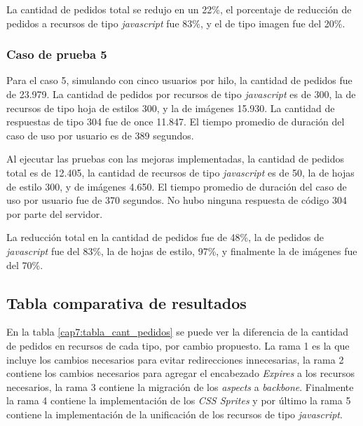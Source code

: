 La cantidad de pedidos total se redujo en un 22\%, el porcentaje de reducción de pedidos a recursos de tipo \emph{javascript} fue 83\%, y el de 
tipo imagen fue del 20\%.

\subsubsection{Caso de prueba 5}

Para el caso 5, simulando con cinco usuarios por hilo, la cantidad de pedidos fue de 23.979. La cantidad de pedidos por recursos
de tipo \emph{javascript} es de 300, la de recursos de tipo hoja de estilos 300, y la de imágenes 15.930. La cantidad de respuestas de tipo 304 
fue de once 11.847. El tiempo promedio de duración del caso de uso por usuario es de 389 segundos. 

Al ejecutar las pruebas con las mejoras implementadas, la cantidad de pedidos total es de 12.405, la cantidad de recursos de tipo \emph{javascript} es de
50, la de hojas de estilo 300, y de imágenes 4.650. El tiempo promedio de duración del caso de uso por usuario fue de 370 segundos. No hubo ninguna
respuesta de código 304 por parte del servidor.

La reducción total en la cantidad de pedidos fue de 48\%, la de pedidos de \emph{javascript} fue del 83\%, la de hojas de estilo,
97\%, y finalmente la de imágenes fue del 70\%.

\subsection{Tabla comparativa de resultados}

En la tabla \ref{cap7:tabla_cant_pedidos} se puede ver la diferencia de la cantidad de pedidos en recursos de cada tipo, por cambio propuesto.  La rama 1 es la que incluye los 
cambios necesarios para evitar redirecciones innecesarias, la rama 2 contiene los cambios necesarios para agregar el encabezado \emph{Expires} a los recursos necesarios,
la rama 3 contiene la migración de los \emph{aspects} a \emph{backbone}. Finalmente la rama 4 contiene la implementación de los \emph{CSS Sprites} y por último la rama 5 
contiene la implementación de la unificación de los recursos de tipo \emph{javascript}.

